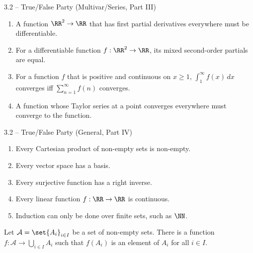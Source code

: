 \documentclass{beamer}
\theoremstyle{plain}
\begin{document}
\begin{frame}{3.2 -- True/False Party (Multivar/Series, Part III)}
  \begin{enumerate}
   \item A function $\RR^2 \to \RR$ that has first partial derivatives everywhere
  must be differentiable.

\item For a differentiable function $f : \RR^2 \to \RR$, its mixed
    second-order partials are equal. 

    \item For a function $f$ that is positive and continuous on $x \geq 1$,
  $\int_1^\infty f(x) \, dx$ converges iff $\sum_{n=1}^\infty f(n)$ converges. 

\item A function whose Taylor series at a point converges everywhere must converge to the  function. 
\end{enumerate}
\end{frame}
\begin{frame}{3.2 -- True/False Party (General, Part IV)}
  \begin{enumerate}
  \item Every Cartesian product of non-empty sets is non-empty. 
    
  \item Every vector space has a basis.

  \item Every surjective function has a right inverse. 

  \item Every linear function $f : \RR \to \RR$ is continuous. 

  \item Induction can only be done over finite sets, such as $\NN$. 
\end{enumerate}
\pause
\begin{theorem}
  Let $\mathcal A = \set{A_i}_{i \in I}$ be a set of non-empty sets. There
    is a function $f : \mathcal A \to \bigcup_{i \in I} A_i$ such that $f(A_i)$
   is an element of $A_i$ for all $i \in I$.  
\end{theorem}
\end{frame}
\end{document}
